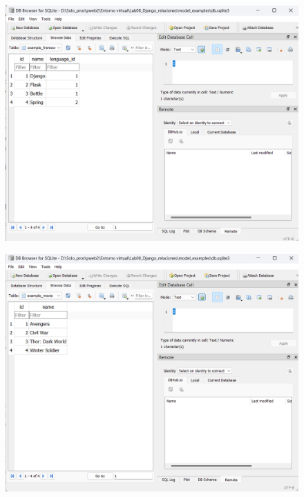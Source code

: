 \documentclass{article}
\begin{document}
	\begin{figure}[H]
		\centering
		\includegraphics[width=1.0\textwidth,keepaspectratio]{img/C2.png}
	\end{figure}
	\begin{figure}[H]
		\centering
		\includegraphics[width=1.0\textwidth,keepaspectratio]{img/C3.png}
	\end{figure}
\end{document}
